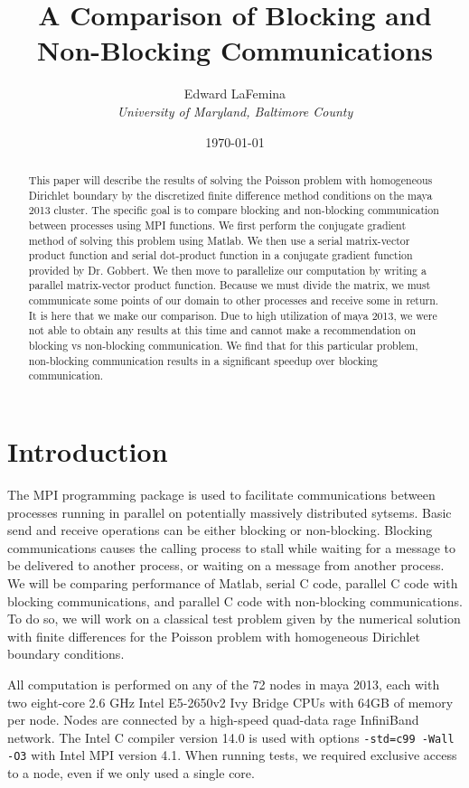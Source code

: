 \documentclass[11pt]{article}
\author{Edward LaFemina \\
		\it{University of Maryland, Baltimore County}}
\title{A Comparison of Blocking and Non-Blocking Communications}
\date{\today}
\begin{document}
\maketitle

\begin{abstract}
This paper will describe the results of solving the Poisson problem with homogeneous Dirichlet boundary by the discretized finite difference method conditions on the maya 2013 cluster. The specific goal is to compare blocking and non-blocking communication between processes using MPI functions. We first perform the conjugate gradient method of solving this problem using Matlab. We then use a serial matrix-vector product function and serial dot-product function in a conjugate gradient function provided by Dr. Gobbert. We then move to parallelize our computation by writing a parallel matrix-vector product function. Because we must divide the matrix, we must communicate some points of our domain to other processes and receive some in return. It is here that we make our comparison. Due to high utilization of maya 2013, we were not able to obtain any results at this time and cannot make a recommendation  on blocking vs non-blocking communication. We find that for this particular problem, non-blocking communication results in a significant speedup over blocking communication.
\end{abstract}
\section{Introduction}
The MPI programming package is used to facilitate communications between processes running in parallel on potentially massively distributed sytsems. Basic send and receive operations can be either blocking or non-blocking. Blocking communications causes the calling process to stall while waiting for a message to be delivered to another process, or waiting on a message from another process. We will be comparing performance of Matlab, serial C code, parallel C code with blocking communications, and parallel C code with non-blocking communications. To do so, we will work on a classical test problem given by the numerical solution with finite differences for the Poisson problem with homogeneous Dirichlet boundary conditions.

All computation is performed on any of the 72 nodes in maya 2013, each with two eight-core 2.6 GHz Intel E5-2650v2 Ivy Bridge CPUs with 64GB of memory per node. Nodes are connected by a high-speed quad-data rage InfiniBand network. The Intel C compiler version 14.0 is used with options \texttt{-std=c99 -Wall -O3} with Intel MPI version 4.1. When running tests, we required exclusive access to a node, even if we only used a single core.
\end{document}
